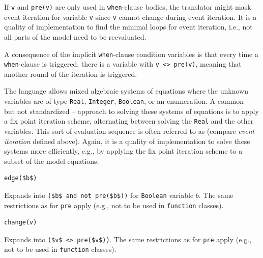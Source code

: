 \begin{operatordefinition}[pre]
\begin{semantics}
\begin{nonnormative}
If \lstinline!v! and \lstinline!pre(v)! are only used in \lstinline!when!-clause bodies, the translator might mask event iteration for variable \lstinline!v! since \lstinline!v! cannot change during event iteration.
It is a quality of implementation to find the minimal loops for event iteration, i.e., not all parts of the model need to be reevaluated.

A consequence of the implicit \lstinline!when!-clause condition variables is that every time a \lstinline!when!-clause is triggered, there is a variable with \lstinline!v <> pre(v)!, meaning that another round of the iteration is triggered.

The language allows mixed algebraic systems of equations where the unknown variables are of type \lstinline!Real!, \lstinline!Integer!, \lstinline!Boolean!, or an enumeration.
A common -- but not standardized -- approach to solving these systems of equations is to apply a fix point iteration scheme, alternating between solving the \lstinline!Real! and the other variables.
This sort of evaluation sequence is often referred to as  (compare \emph{event iteration} defined above).
Again, it is a quality of implementation to solve these systems more efficiently, e.g., by applying the fix point iteration scheme to a subset of the model equations.
\end{nonnormative}
\end{semantics}
\end{operatordefinition}

\begin{operatordefinition}[edge]
\begin{synopsis}\begin{lstlisting}
edge($b$)
\end{lstlisting}\end{synopsis}
\begin{semantics}
Expands into \lstinline!($b$ and not pre($b$))! for \lstinline!Boolean! variable $b$.
The same restrictions as for \lstinline!pre! apply (e.g., not to be used in \lstinline!function! classes).
\end{semantics}
\end{operatordefinition}

\begin{operatordefinition}[change]
\begin{synopsis}\begin{lstlisting}
change(v)
\end{lstlisting}\end{synopsis}
\begin{semantics}
Expands into \lstinline!($v$ <> pre($v$))!.
The same restrictions as for \lstinline!pre! apply (e.g., not to be used in \lstinline!function! classes).
\end{semantics}
\end{operatordefinition}

